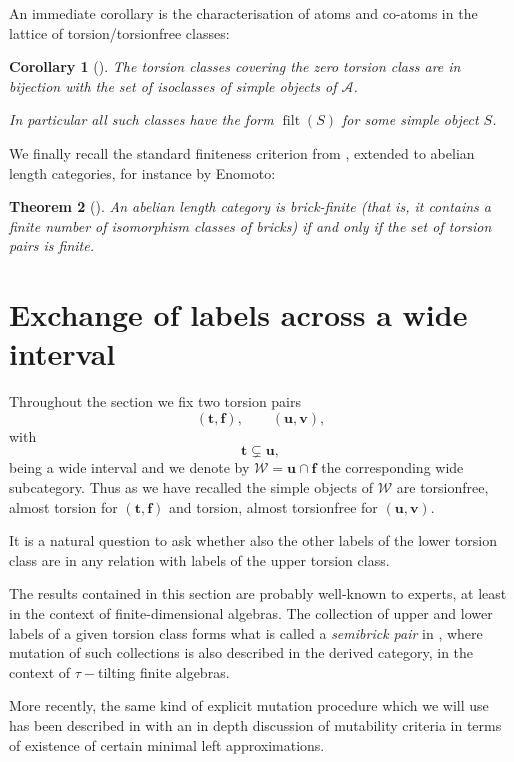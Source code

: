 \documentclass[10pt,a4paper]{amsart}
\newtheorem{theorem}{Theorem}[section]
\newtheorem{corollary}[theorem]{Corollary}
\newcommand{\filt}{\operatorname{filt}}
\begin{document}
An immediate corollary is the characterisation of atoms and co-atoms in the lattice of torsion/torsionfree classes:

\begin{corollary}[{\cite[Proposition 3.5]{AsaiPfeifer}}]
The torsion classes covering the zero torsion class are in bijection with the set of isoclasses of simple objects of \( \mathcal{A} \). 

In particular all such classes have the form \(\filt(S) \) for some simple object $ S $.
\end{corollary}

We finally recall the standard finiteness criterion from \cite{DIJ}, extended to abelian length categories, for instance by Enomoto:

\begin{theorem}[{\cite[Theorem 5.5]{EnomotoMonobrick}}]\label{thm:brick-finite-torsion-finite}
An abelian length category is brick-finite (that is, it contains a finite number of isomorphism classes of bricks) if and only if the set of torsion pairs is finite.
\end{theorem}

\section{Exchange of labels across a wide interval}

 Throughout the section we fix two torsion pairs
\[
(\mathbf t,\mathbf f),\qquad (\mathbf u,\mathbf v),
\]
with
\[
\mathbf t\subsetneq \mathbf u,
\]
being a wide interval 
and we denote by \(\mathcal{W} = \mathbf{u} \cap \mathbf{f} \) the corresponding wide subcategory. Thus as we have recalled the simple objects of \(\mathcal{W}\) are torsionfree, almost torsion for \((\mathbf t,\mathbf f)\) and torsion, almost torsionfree for \((\mathbf u,\mathbf v)\).

It is a natural question to ask whether also the other labels of the lower torsion class are in any relation with labels of the upper torsion class. 

The results contained in this section are probably well-known to experts, at least in the context of finite-dimensional algebras. The collection of upper and lower labels of a given torsion class forms what is called a \emph{semibrick pair} in \cite{BH}, where mutation of such collections is also described in the derived category, in the context of  \( \tau-\)tilting finite algebras.

More recently, the same kind of explicit mutation procedure which we will use has been described in \cite[Theorem 2.5]{MutSimple} with an in depth discussion of mutability criteria in terms of existence of certain minimal left approximations.
\end{document}
